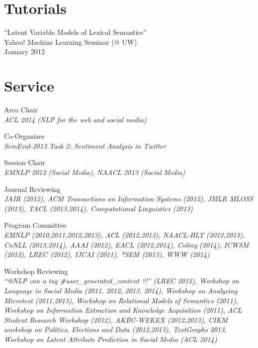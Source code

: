 \documentclass[margin,line]{res}
\begin{document}
\begin{resume}
\section{\sc Tutorials}
``Latent Variable Models of Lexical Semantics'' \\
Yahoo! Machine Learning Seminar (@ UW) \\
January 2012


\begin{comment}
``Profiling NAVDAS'' \\
Naval Research Laboratory Monterey, CA \\
August 2006

``Profiling Parallel Fortran/MPI programs using TAU'' (Training Class for NRL Scientists) \\
Naval Research Laboratory Monterey, CA \\
August 2006
\end{comment}

\section{\sc Service}
Area Chair \\
\emph{ACL 2014 (NLP for the web and social media)}

Co-Organizer \\
\emph{SemEval-2013 Task 2: Sentiment Analysis in Twitter}

Session Chair \\
\emph{EMNLP 2012 (Social Media)}, \emph{NAACL 2013 (Social Media)}

Journal Reviewing \\
\emph{JAIR (2012), ACM Transactions on Information Systems (2012), JMLR MLOSS (2013), TACL (2013,2014), Computational Linguistics (2013)}

Program Committee \\
\emph{EMNLP (2010,2011,2012,2013), ACL (2012,2013), NAACL-HLT (2012,2013), CoNLL (2013,2014), AAAI (2012), EACL (2012,2014), Coling (2014), ICWSM (2012), LREC (2012), IJCAI (2011), *SEM (2013), WWW (2014)}

Workshop Reviewing \\
\emph{``@NLP can u tag \#user\_generated\_content ?!'' (LREC 2012), Workshop on Language in Social Media (2011, 2012, 2013, 2014), Workshop on Analyzing Microtext (2011,2013), Workshop on Relational Models of Semantics (2011), Workshop on Information Extraction and Knowledge Acquisition (2011), ACL Student Research Workshop (2012), AKBC-WEKEX (2012,2013), CIKM workshop on Politics, Elections and Data (2012,2013), TextGraphs 2013, Workshop on Latent Attribute Prediction in Social Media (ACL 2014)}


\end{resume}
\end{document}
